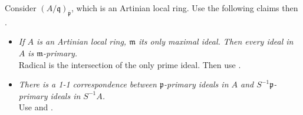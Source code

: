 \begin{exercise}\label{ex8.6}
 	Consider $(A/\mathfrak{q})_{\overline{\mathfrak{p}}}$, which is an Artinian local ring. Use the following claims then .
 	\begin{itemize}
 		\item \textit{If $A$ is an Artinian local ring, $\mathfrak{m}$ its only maximal ideal. Then every ideal in $A$ is $\mathfrak{m}$-primary.}\\ Radical is the intersection of the only prime ideal. Then use .
 		\item \textit{There is a 1-1 correspondence between $\mathfrak{p}$-primary ideals in $A$ and $S^{-1}\mathfrak{p}$-primary ideals in $S^{-1}A$.}\\
 		Use  and .
 	\end{itemize}
\end{exercise}